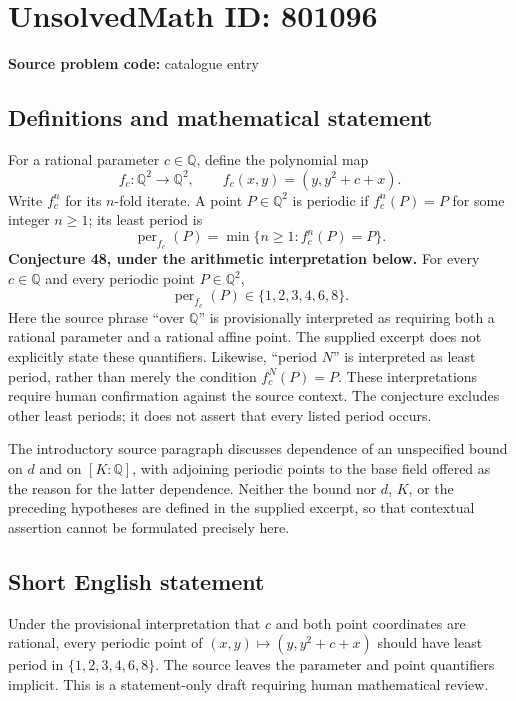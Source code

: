 \documentclass[11pt]{article}
\newcommand{\Q}{\mathbb{Q}}
\begin{document}
\section*{UnsolvedMath ID: 801096}
\textbf{Source problem code:} catalogue entry
\subsection{Definitions and mathematical statement}
For a rational parameter \(c\in\Q\), define the polynomial map
\[
f_c\colon\Q^2\longrightarrow\Q^2,\qquad f_c(x,y)=(y,y^2+c+x).
\]
Write \(f_c^n\) for its \(n\)-fold iterate. A point \(P\in\Q^2\) is periodic if \(f_c^n(P)=P\) for some integer \(n\geq1\); its least period is
\[
\operatorname{per}_{f_c}(P)=\min\{n\geq1:f_c^n(P)=P\}.
\]
\textbf{Conjecture 48, under the arithmetic interpretation below.} For every \(c\in\Q\) and every periodic point \(P\in\Q^2\),
\[
\operatorname{per}_{f_c}(P)\in\{1,2,3,4,6,8\}.
\]
Here the source phrase ``over \(\Q\)'' is provisionally interpreted as requiring both a rational parameter and a rational affine point. The supplied excerpt does not explicitly state these quantifiers. Likewise, ``period \(N\)'' is interpreted as least period, rather than merely the condition \(f_c^N(P)=P\). These interpretations require human confirmation against the source context. The conjecture excludes other least periods; it does not assert that every listed period occurs.

The introductory source paragraph discusses dependence of an unspecified bound on \(d\) and on \([K:\Q]\), with adjoining periodic points to the base field offered as the reason for the latter dependence. Neither the bound nor \(d\), \(K\), or the preceding hypotheses are defined in the supplied excerpt, so that contextual assertion cannot be formulated precisely here.
\subsection{Short English statement}
Under the provisional interpretation that \(c\) and both point coordinates are rational, every periodic point of \((x,y)\mapsto(y,y^2+c+x)\) should have least period in \(\{1,2,3,4,6,8\}\). The source leaves the parameter and point quantifiers implicit. This is a statement-only draft requiring human mathematical review.
\end{document}
